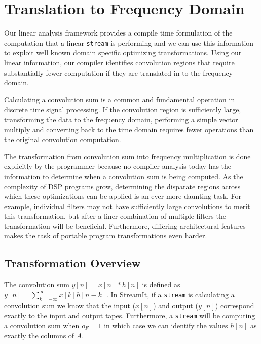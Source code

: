 
\section{Translation to Frequency Domain}
\label{sec:freq}

Our linear analysis framework provides a compile time formulation of
the computation that a linear {\tt stream} is performing and we can
use this information to exploit well known domain specific optimizing
transformations.  Using our linear information, our compiler identifies
convolution regions that require substantially fewer computation if they 
are translated in to the frequency domain.

Calculating a convolution sum is a common and fundamental operation in
discrete time signal processing.
If the convolution region is sufficiently large, transforming the data to the
frequency domain, performing a simple vector multiply and converting
back to the time domain requires fewer operations than the original 
convolution computation.

The transformation from convolution sum into frequency multiplication
is done explicitly by the programmer because no compiler analysis today
has the information to determine when a convolution sum is being
computed.  As the complexity of DSP programs grow, determining the
disparate regions across which these optimizations can be applied is
an ever more daunting task. For example, individual filters may not
have sufficiently large convolutions to merit this transformation, but
after a liner combination of multiple filters the transformation will
be beneficial.  Furthermore, differing architectural features makes
the task of portable program transformations even harder.

\subsection{Transformation Overview}
The convolution sum $y[n]=x[n]*h[n]$ is defined 
as $y[n]=\sum_{k=-\infty}^{\infty}x[k]h[n-k]$.
In StreamIt, if a {\tt stream} is calculating a convolution sum we know that 
the input ($x[n]$) and output ($y[n]$) correspond exactly to the input and output tapes. 
Furthermore, a {\tt stream} will be computing a convolution sum when $o_F=1$ in which
case we can identify the values $h[n]$ as exactly the columns of $A$.

